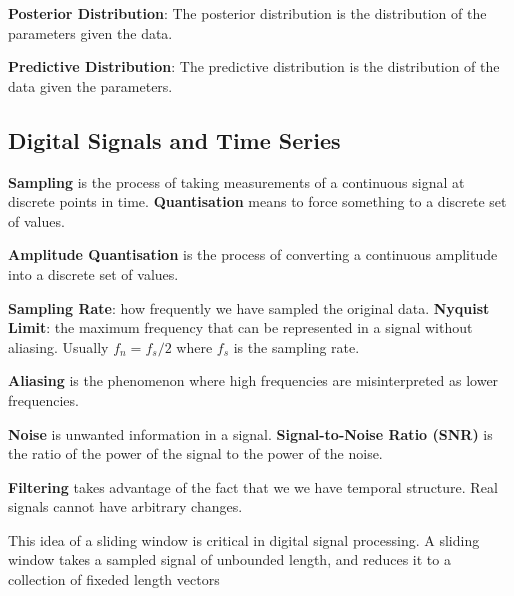 \documentclass{article}
\begin{document}
\textbf{Posterior Distribution}:
The posterior distribution is the distribution of the parameters given the data.

\textbf{Predictive Distribution}:
The predictive distribution is the distribution of the data given the parameters.



\subsection*{Digital Signals and Time Series}


\textbf{Sampling} is the process of taking measurements of a continuous signal at discrete points in time.
\textbf{Quantisation} means to force something to a discrete set of values.


\textbf{Amplitude Quantisation} is the process of converting a continuous amplitude into a discrete set of values.


\textbf{Sampling Rate}: how frequently we have sampled the original data.
\textbf{Nyquist Limit}: the maximum frequency that can be represented in a signal without aliasing.
Usually $f_n = f_s/2$ where $f_s$ is the sampling rate.


\textbf{Aliasing} is the phenomenon where high frequencies are misinterpreted as lower frequencies.


\textbf{Noise} is unwanted information in a signal.
\textbf{Signal-to-Noise Ratio (SNR)} is the ratio of the power of the signal to the power of the noise.


\textbf{Filtering} takes advantage of the fact that we we have temporal structure.
Real signals cannot have arbitrary changes.

This idea of a sliding window is critical in digital signal processing. A
sliding window takes a sampled signal of unbounded length, and reduces
it to a collection of fixeded length vectors

\end{document}
